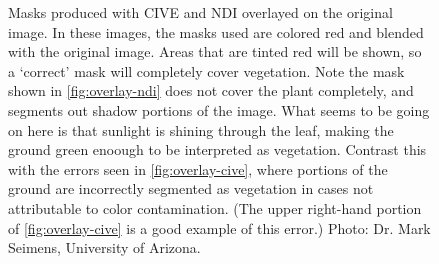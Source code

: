 \documentclass[letterpaper]{article}
\begin{document}
{\begin{figure}[H]
	\caption[Masks overlayed on original images]{Masks produced with CIVE and NDI overlayed on the original image. In these images, the masks used are colored red and blended with the original image. Areas that are tinted red will be shown, so a `correct' mask will completely cover vegetation. Note the mask shown in \ref{fig:overlay-ndi} does not cover the plant completely, and segments out shadow portions of the image. What seems to be going on here is that sunlight is shining through the leaf, making the ground green enoough to be interpreted as vegetation. Contrast this with the errors seen in \ref{fig:overlay-cive}, where portions of the ground are incorrectly segmented as vegetation in cases not attributable to color contamination. (The upper right-hand portion of \ref{fig:overlay-cive} is a good example of this error.) Photo: Dr. Mark Seimens, University of Arizona.}
	\label{fig:overlay}
\end{figure}


}
\end{document}
